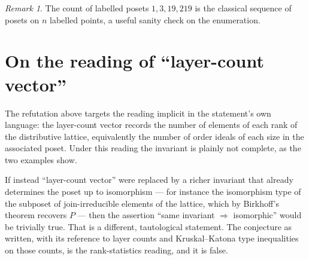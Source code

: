 \documentclass[11pt]{article}
\theoremstyle{remark}
\newtheorem{remark}[definition]{Remark}
\begin{document}
\begin{remark}
The count of labelled posets $1, 3, 19, 219$ is the classical sequence of posets
on $n$ labelled points, a useful sanity check on the enumeration.
\end{remark}

\section{On the reading of ``layer-count vector''}

The refutation above targets the reading implicit in the statement's own language:
the layer-count vector records the number of elements of each rank of the
distributive lattice, equivalently the number of order ideals of each size in the
associated poset.  Under this reading the invariant is plainly not complete, as
the two examples show.

If instead ``layer-count vector'' were replaced by a richer invariant that already
determines the poset up to isomorphism --- for instance the isomorphism type of the
subposet of join-irreducible elements of the lattice, which by Birkhoff's theorem
recovers $P$ --- then the assertion ``same invariant $\Rightarrow$ isomorphic''
would be trivially true.  That is a different, tautological statement.  The
conjecture as written, with its reference to layer counts and Kruskal--Katona type
inequalities on those counts, is the rank-statistics reading, and it is false.
\end{document}
